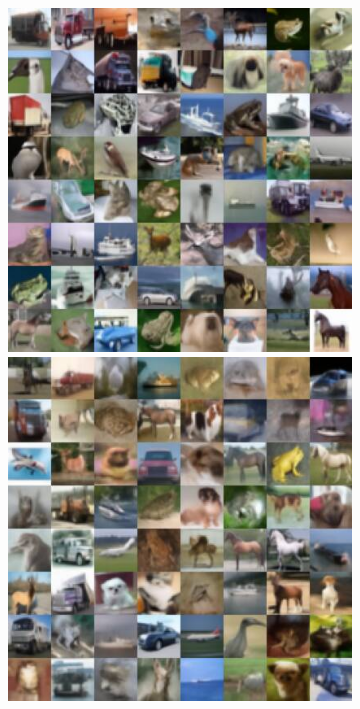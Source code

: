 \begin{figure}
  \begin{subfigure}{0.495\textwidth}
    \includegraphics[width=\linewidth]{figs/imgs/ddpm_ddim_cifar10_data_samples_T_500_10_steps.jpg}
    \includegraphics[width=\linewidth]{figs/imgs/ddpm_glsddim_cifar10_data_samples_T_500_5_steps.jpg}

\end{subfigure}
\end{figure}
